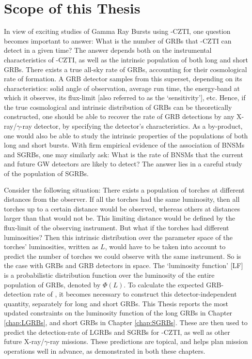 \section{Scope of this Thesis}
\label{sec:scope}
In view of exciting studies of Gamma Ray Bursts using \AS -CZTI, one question becomes important to answer: What is the number of GRBs that \AS -CZTI can detect in a given time? The answer depends both on the instrumental characteristics of \AS -CZTI, as well as the intrinsic population of both long and short GRBs. There exists a true all-sky rate of GRBs, accounting for their cosmological rate of formation. A GRB detector samples from this superset, depending on its characteristics: solid angle of observation, average run time, the energy-band at which it observes, its flux-limit [also referred to as the `sensitivity'], etc. Hence, if the true cosmological and intrinsic distribution of GRBs can be theoretically constructed, one should be able to recover the rate of GRB detections by any X-ray/$\gamma$-ray detector, by specifying the detector's characteristics. As a by-product, one would also be able to study the intrinsic properties of the populations of both long and short bursts. With firm empirical evidence of the association of BNSMs and SGRBs, one may similarly ask: What is the rate of BNSMs that the current and future GW detectors are likely to detect? The answer lies in a careful study of the population of SGRBs.

Consider the following situation: There exists a population of torches at different distances from the observer. If all the torches had the same luminosity, then all torches up to a certain distance would be observed, whereas others at distances larger than that would not be. This limiting distance would be defined by the flux-limit of the observing instrument. But what if the torches had different luminosities? Then this intrinsic distribution over the parameter space of the torches' luminosities, written as $L$, would have to be taken into account to predict the number of torches we could observe with the same instrument. So is the case with GRBs and GRB detectors in space. The `luminosity function' [LF] is a probabilistic distribution function over the luminosity of the entire population of GRBs, denoted by $\Phi (L)$. To calculate the expected GRB-detection rate of \AS, it becomes necessary to construct this detector-independent quantity, separately for long and short GRBs. This Thesis reports the most updated constraints on the luminosity function of the long GRBs in Chapter \ref{chap:LGRBs}, and short GRBs in Chapter \ref{chap:SGRBs}. These are then used to predict the detection-rate of LGRBs and SGRBs for \AS -CZTI, as well as other future X-ray/$\gamma$-ray missions. These predictions are topical, and helps plan mission operations well in advance, as demonstrated in both these chapters.


